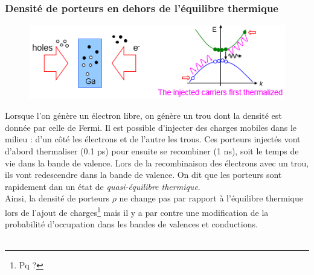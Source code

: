 	\subsubsection{Densité de porteurs en dehors de l'équilibre thermique}
		\begin{figure}
	\vspace{-5mm}
	\includegraphics[scale=0.5]{ch5/image13}
	\end{figure}
	Lorsque l'on génère un électron libre, on génère un trou dont la densité est donnée par celle
	de Fermi. Il est possible d'injecter des charges mobiles dans le milieu : d'un côté les 
	électrons et de l'autre les trous. Ces porteurs injectés vont d'abord thermaliser (0.1 ps) 
	pour ensuite se recombiner (1 ns), soit le temps de vie dans la bande de valence. Lors de la
	recombinaison des électrons avec un trou, ils vont redescendre dans la bande de valence. On dit 
	que les porteurs sont rapidement dan un état de \textit{quasi-équilibre thermique}.\\
	
	Ainsi, la densité de porteurs $\rho$ ne change pas par rapport à l'équilibre thermique lors de
	l'ajout de charges\footnote{Pq ?} mais il y a par contre une modification de la probabilité
	d'occupation dans les bandes de valences et conductions.\ \\
	
	\ \\	

